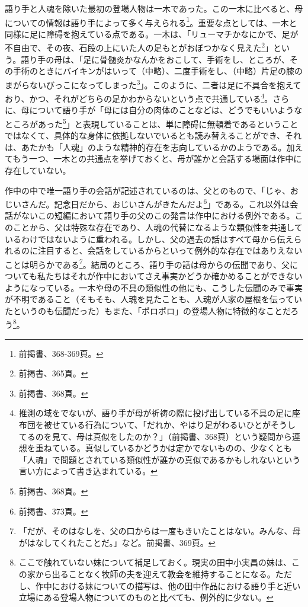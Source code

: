 語り手と人魂を除いた最初の登場人物は一木であった。この一木に比べると、母についての情報は語り手によって多く与えられる\footnote{前掲書、368-369頁。}。重要な点としては、一木と同様に足に障碍を抱えている点である。一木は、「リューマチかなにかで、足が不自由で、その夜、石段の上にいた人の足もとがおぼつかなく見えた\footnote{前掲書、365頁。}」という。語り手の母は、「足に骨髄炎かなんかをおこして、手術をし、ところが、その手術のときにバイキンがはいって（中略）、二度手術をし、（中略）片足の膝のまがらないびっこになってしまった\footnote{前掲書、368頁。}」。このように、二者は足に不具合を抱えており、かつ、それがどちらの足かわからないという点で共通している\footnote{推測の域をでないが、語り手が母が祈祷の際に投げ出している不具の足に座布団を被せている行為について、「だれか、やはり足がわるいひとがそうしてるのを見て、母は真似をしたのか？」（前掲書、368頁）という疑問から連想を重ねている。真似しているかどうかは定かでないものの、少なくとも「人魂」で問題とされている類似性が誰かの真似であるかもしれないという言い方によって書き込まれている。}。さらに、母について語り手が「母には自分の肉体のことなどは、どうでもいいようなところがあった\footnote{前掲書、368頁。}」と表現していることは、単に障碍に無頓着であるということではなくて、具体的な身体に依拠しないでいるとも読み替えることができ、それは、あたかも「人魂」のような精神的存在を志向しているかのようである。加えてもう一つ、一木との共通点を挙げておくと、母が誰かと会話する場面は作中に存在していない。

作中の中で唯一語り手の会話が記述されているのは、父とのもので、「じゃ、おじいさんだ。記念日だから、おじいさんがきたんだよ\footnote{前掲書、373頁。}」である。これ以外は会話がないこの短編において語り手の父のこの発言は作中における例外である。このことから、父は特殊な存在であり、人魂の代替になるような類似性を共通しているわけではないように重われる。しかし、父の過去の話はすべて母から伝えられるのに注目すると、会話をしているからといって例外的な存在ではありえないことは明らかである\footnote{「だが、そのはなしを、父の口からは一度もきいたことはない。みんな、母がはなしてくれたことだ。」など。前掲書、369頁。}。結局のところ、語り手の話は母からの伝聞であり、父についても私たちはそれが作中においてさえ事実かどうか確かめることができないようになっている。一木や母の不具の類似性の他にも、こうした伝聞のみで事実が不明であること（そもそも、人魂を見たことも、人魂が人家の屋根を伝っていたというのも伝聞だった）もまた、「ポロポロ」の登場人物に特徴的なことだろう\footnote{ここで触れていない妹について補足しておく。現実の田中小実昌の妹は、この家から出ることなく牧師の夫を迎えて教会を維持することになる。ただし、作中における妹についての描写は、他の田中作品における語り手と近い立場にある登場人物についてのものと比べても、例外的に少ない。}。

